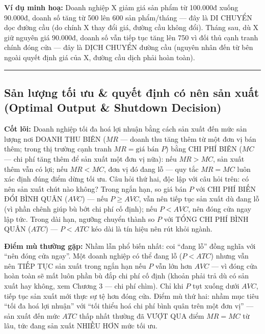 \documentclass[
]{article}
\begin{document}
\textbf{Ví dụ minh hoạ:} Doanh nghiệp X giảm giá sản phẩm từ 100.000đ
xuống 90.000đ, doanh số tăng từ 500 lên 600 sản phẩm/tháng --- đây là DI
CHUYỂN dọc đường cầu (do chính X thay đổi giá, đường cầu không đổi).
Tháng sau, dù X giữ nguyên giá 90.000đ, doanh số vẫn tiếp tục tăng lên
750 vì đối thủ cạnh tranh chính đóng cửa --- đây là DỊCH CHUYỂN đường
cầu (nguyên nhân đến từ bên ngoài quyết định giá của X, đường cầu dịch
phải hoàn toàn).

\begin{center}\rule{0.5\linewidth}{0.5pt}\end{center}

\subsection{Sản lượng tối ưu \& quyết định có nên sản xuất (Optimal
Output \& Shutdown
Decision)}\label{sux1ea3n-lux1b0ux1ee3ng-tux1ed1i-ux1b0u-quyux1ebft-ux111ux1ecbnh-cuxf3-nuxean-sux1ea3n-xuux1ea5t-optimal-output-shutdown-decision}

\textbf{Cốt lõi:} Doanh nghiệp tối đa hoá lợi nhuận bằng cách sản xuất
đến mức sản lượng nơi DOANH THU BIÊN (\(MR\) --- doanh thu tăng thêm từ
một đơn vị bán thêm; trong thị trường cạnh tranh
\(MR = \text{giá bán } P\)) bằng CHI PHÍ BIÊN (\(MC\) --- chi phí tăng
thêm để sản xuất một đơn vị nữa): nếu \(MR > MC\), sản xuất thêm vẫn có
lợi; nếu \(MR < MC\), đơn vị đó đang lỗ --- quy tắc \(MR = MC\) luôn xác
định đúng điểm dừng tối ưu. Câu hỏi thứ hai, độc lập với câu hỏi trên:
có nên sản xuất chút nào không? Trong ngắn hạn, so giá bán \(P\) với CHI
PHÍ BIẾN ĐỔI BÌNH QUÂN (\(AVC\)) --- nếu \(P \ge AVC\), vẫn nên tiếp tục
sản xuất dù đang lỗ (vì phần chênh giúp bù bớt chi phí cố định); nếu
\(P < AVC\), nên đóng cửa ngay lập tức. Trong dài hạn, ngưỡng chuyển
thành so \(P\) với TỔNG CHI PHÍ BÌNH QUÂN (\(ATC\)) --- \(P < ATC\) kéo
dài là tín hiệu nên rút khỏi ngành.

\textbf{Điểm mù thường gặp:} Nhầm lẫn phổ biến nhất: coi ``đang lỗ''
đồng nghĩa với ``nên đóng cửa ngay''. Một doanh nghiệp có thể đang lỗ
(\(P < ATC\)) nhưng vẫn nên TIẾP TỤC sản xuất trong ngắn hạn nếu \(P\)
vẫn lớn hơn \(AVC\) --- vì đóng cửa hoàn toàn sẽ mất luôn phần bù đắp
chi phí cố định (khoản phải trả dù có sản xuất hay không, xem Chương 3
--- chi phí chìm). Chỉ khi \(P\) tụt xuống dưới \(AVC\), tiếp tục sản
xuất mới thực sự tệ hơn đóng cửa. Điểm mù thứ hai: nhầm mục tiêu ``tối
đa hoá lợi nhuận'' với ``tối thiểu hoá chi phí bình quân trên một đơn
vị'' --- sản xuất đến mức \(ATC\) thấp nhất thường đã VƯỢT QUA điểm
\(MR = MC\) từ lâu, tức đang sản xuất NHIỀU HƠN mức tối ưu.
\end{document}

